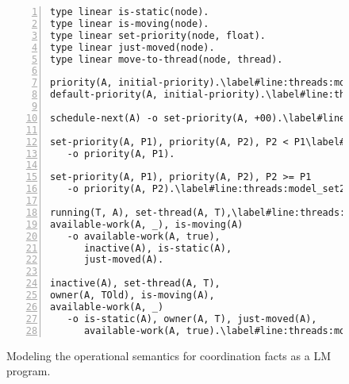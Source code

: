 \begin{figure}[h!]
\begin{Verbatim}[numbers=left,fontsize=\codesize,commandchars=\\\#\&]
type linear is-static(node).
type linear is-moving(node).
type linear set-priority(node, float).
type linear just-moved(node).
type linear move-to-thread(node, thread).

priority(A, initial-priority).\label#line:threads:model_prio&\hfill// Priority facts.
default-priority(A, initial-priority).\label#line:threads:model_defprio&

schedule-next(A) -o set-priority(A, +00).\label#line:threads:model_snext&

set-priority(A, P1), priority(A, P2), P2 < P1\label#line:threads:model_set1&
   -o priority(A, P1).

set-priority(A, P1), priority(A, P2), P2 >= P1
   -o priority(A, P2).\label#line:threads:model_set2&

running(T, A), set-thread(A, T),\label#line:threads:model_thread1&
available-work(A, _), is-moving(A)
   -o available-work(A, true),
      inactive(A), is-static(A),
      just-moved(A).

inactive(A), set-thread(A, T),
owner(A, TOld), is-moving(A),
available-work(A, _)
   -o is-static(A), owner(A, T), just-moved(A),
      available-work(A, true).\label#line:threads:model_thread2&
\end{Verbatim}
\caption{Modeling the operational semantics for coordination facts as a LM
program.}
\label{code:threads:modeling_scheduling}
\end{figure}
